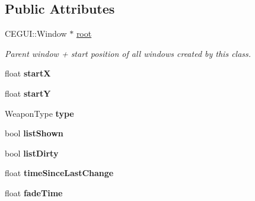 \subsection*{\-Public \-Attributes}
\begin{DoxyCompactItemize}
\item 
\hypertarget{classWeaponInventory_a6359c329d9d27e34197f42a09f6d5ff3}{
\-C\-E\-G\-U\-I\-::\-Window $\ast$ \hyperlink{classWeaponInventory_a6359c329d9d27e34197f42a09f6d5ff3}{root}}
\label{d8/da9/classWeaponInventory_a6359c329d9d27e34197f42a09f6d5ff3}

\begin{DoxyCompactList}\small\item\em \-Parent window + start position of all windows created by this class. \end{DoxyCompactList}\item 
\hypertarget{classWeaponInventory_a7bc46e9eb905aed36834ff41fdcbb6c3}{
float {\bfseries start\-X}}
\label{d8/da9/classWeaponInventory_a7bc46e9eb905aed36834ff41fdcbb6c3}

\item 
\hypertarget{classWeaponInventory_af95d3e2d3d9f9c820952d818f831cbf7}{
float {\bfseries start\-Y}}
\label{d8/da9/classWeaponInventory_af95d3e2d3d9f9c820952d818f831cbf7}

\item 
\hypertarget{classWeaponInventory_a94ff91dc06a38c83d19cb57838fb6028}{
\-Weapon\-Type {\bfseries type}}
\label{d8/da9/classWeaponInventory_a94ff91dc06a38c83d19cb57838fb6028}

\item 
\hypertarget{classWeaponInventory_a10ff4837f1c739e514e43e68de7a2edb}{
bool {\bfseries list\-Shown}}
\label{d8/da9/classWeaponInventory_a10ff4837f1c739e514e43e68de7a2edb}

\item 
\hypertarget{classWeaponInventory_a3437fe9cf1172e872d02854a49435c0a}{
bool {\bfseries list\-Dirty}}
\label{d8/da9/classWeaponInventory_a3437fe9cf1172e872d02854a49435c0a}

\item 
\hypertarget{classWeaponInventory_a0b7cd38aa0fb47a67070891220103679}{
float {\bfseries time\-Since\-Last\-Change}}
\label{d8/da9/classWeaponInventory_a0b7cd38aa0fb47a67070891220103679}

\item 
\hypertarget{classWeaponInventory_a90882278a6c3739e065fa566c01684ef}{
float {\bfseries fade\-Time}}
\label{d8/da9/classWeaponInventory_a90882278a6c3739e065fa566c01684ef}


\end{DoxyCompactItemize}
